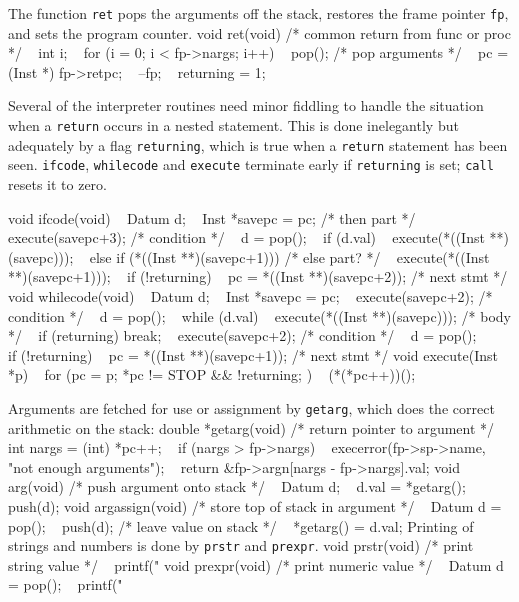 \noindent
The function {\tt ret} pops the arguments off the stack, restores
the frame pointer {\tt fp}, and sets the program counter.
\begincode
void ret(void)  /* common return from func or proc */
{
~       int i;
~       for (i = 0; i < fp->nargs; i++)
~               pop();  /* pop arguments */
~       pc = (Inst *) fp->retpc;
~       --fp;
~       returning = 1;
}
\endcode

Several of the interpreter routines need minor fiddling to handle
the situation when a {\tt return} occurs in a nested statement.
This is done inelegantly but adequately by a flag {\tt returning},
which is true when a {\tt return} statement has been seen.
{\tt ifcode}, {\tt whilecode} and {\tt execute} terminate early
if {\tt returning} is set; {\tt call} resets it to zero.

\begincode
void ifcode(void)
{
~       Datum d;
~       Inst *savepc = pc;     /* then part */
\smallbreak
~       execute(savepc+3);     /* condition */
~       d = pop();
~       if (d.val)
~               execute(*((Inst **)(savepc)));
~       else if (*((Inst **)(savepc+1))) /* else part? */
~               execute(*((Inst **)(savepc+1)));
~       if (!returning)
~               pc = *((Inst **)(savepc+2)); /* next stmt */
}
\smallbreak
void whilecode(void)
{
~       Datum d;
~       Inst *savepc = pc;
\smallbreak
~       execute(savepc+2);     /* condition */
~       d = pop();
~       while (d.val) {
~               execute(*((Inst **)(savepc)));  /* body */
~               if (returning) break;
~               execute(savepc+2);  /* condition */
~               d = pop();
~       }
~       if (!returning)
~               pc = *((Inst **)(savepc+1)); /* next stmt */
}
\smallbreak
void execute(Inst *p)
{
~       for (pc = p; *pc != STOP && !returning; )
~               (*(*pc++))();
}
\endcode

Arguments are fetched for use or assignment by {\tt getarg},
which does the correct arithmetic on the stack:
\begincode
double *getarg(void)  /* return pointer to argument */
{
~       int nargs = (int) *pc++;
~       if (nargs > fp->nargs)
~               execerror(fp->sp->name, "not enough arguments");
~       return &fp->argn[nargs - fp->nargs].val;
}
\medbreak
void arg(void)  /* push argument onto stack */
{
~       Datum d;
~       d.val = *getarg();
~       push(d);
}
\medbreak
void argassign(void)  /* store top of stack in argument */
{
~       Datum d = pop();
~       push(d);            /* leave value on stack */
~       *getarg() = d.val;
}
\endcode
\noindent
Printing of strings and numbers is done by {\tt prstr}
and {\tt prexpr}.
\begincode
void prstr(void)  /* print string value */
{
~       printf("%
}
\medbreak
void prexpr(void)  /* print numeric value */
{
~       Datum d = pop();
~       printf("%
}
\endcode

